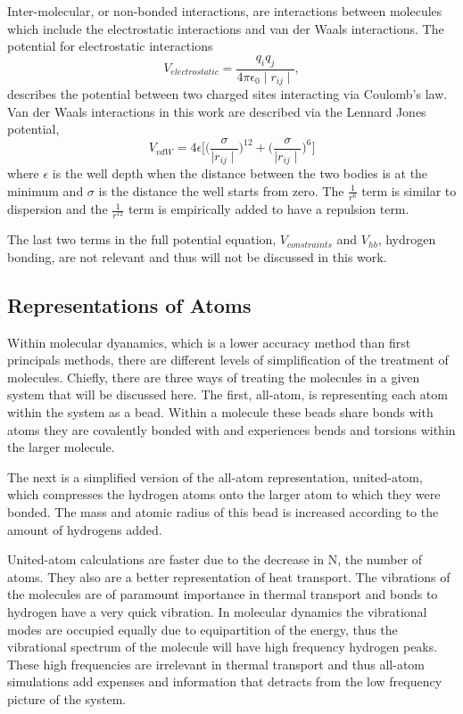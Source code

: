 Inter-molecular,  or non-bonded interactions, are interactions between molecules which include the electrostatic interactions and van der Waals interactions.
The potential for electrostatic interactions
\begin{equation}
    V_{electrostatic} = \frac{q_i q_j}{4 \pi \epsilon_0 \mid r_{ij}\mid},
\end{equation}
describes the potential between two charged sites interacting via Coulomb's law.
Van der Waals interactions in this work are described via the Lennard Jones potential,
\begin{equation}
    V_{vdW} = 4\epsilon\bigg[\bigg(\frac{\sigma}{\mid r_{ij}\mid}\bigg)^{12} + \bigg(\frac{\sigma}{\mid r_{ij}\mid}\bigg)^6\big]
\end{equation}
where $\epsilon$ is the well depth when the distance between the two bodies is at the minimum and $\sigma$ is the distance the well starts from zero. 
The $\frac{1}{r^6}$ term is similar to dispersion and the $\frac{1}{r^{12}}$ term is empirically added to have a repulsion term.

The last two terms in the full potential equation, $V_{constraints}$ and $V_{hb}$, hydrogen bonding, are not relevant and thus will not be discussed in this work.

\subsection{Representations of Atoms}
Within molecular dyanamics, which is a lower accuracy method than first principals methods, there are different levels of simplification of the treatment of molecules.\cite{Leach2001} 
Chiefly, there are three ways of treating the molecules in a given system that will be discussed here. 
The first, all-atom, is representing each atom within the system as a bead. Within a molecule these beads share bonds with atoms they are covalently bonded with and experiences bends and torsions within the larger molecule.

The next is a simplified version of the all-atom representation, united-atom, which compresses the hydrogen atoms onto the larger atom to which they were bonded. The mass and atomic radius of this bead is increased according to the amount of hydrogens added.

United-atom calculations are faster due to the decrease in N, the number of atoms. They also are a better representation of heat transport. The vibrations of the molecules are of paramount importance in thermal transport and bonds to hydrogen have a very quick vibration. In molecular dynamics the vibrational modes are occupied equally due to equipartition of the energy, thus the vibrational spectrum of the molecule will have high frequency hydrogen peaks. These high frequencies are irrelevant in thermal transport and thus all-atom simulations add expenses and information that detracts from the low frequency picture of the system.

